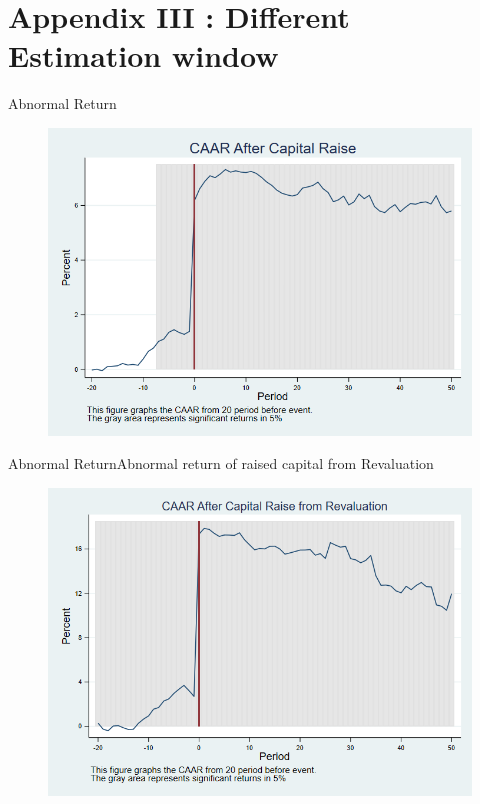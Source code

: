 \documentclass{beamer}
\begin{document}
	\section{Appendix III : Different Estimation window}
	\begin{frame}{Abnormal Return}
		\label{car_abnormalreturn2}
		\begin{figure}
			\centering
			\includegraphics[width=0.7\linewidth]{Output/car_abnormalreturn2.png}
			\label{fig:car_abnormalreturn2}
		\end{figure}
	\end{frame}
	
	\begin{frame}{Abnormal Return}{Abnormal return of raised capital from Revaluation}
		\label{car_abnormalreturn2Revaluation}
		\begin{figure}
			\centering
			\includegraphics[width=0.65\linewidth]{Output/car_abnormalreturn2Revaluation.png}
			\label{fig:car_abnormalreturn2Revaluation}
		\end{figure}
	\end{frame}
	
\end{document}
